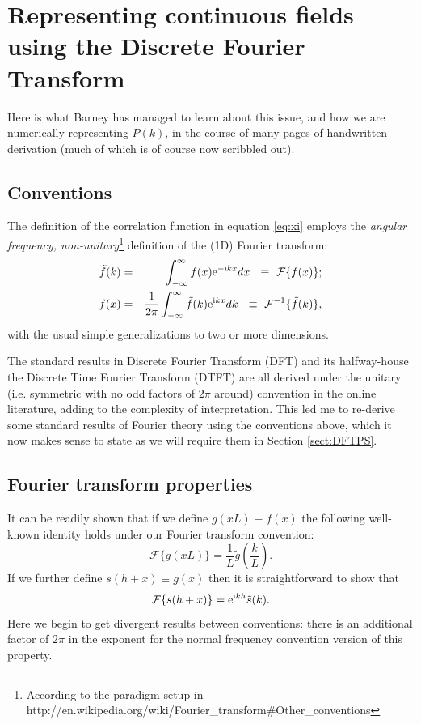 \documentclass[preprint]{aastex}
\newcommand{\mi}{{\rm i}}
\newcommand{\me}{{\rm e}}
\begin{document}
\section{Representing continuous fields using the Discrete Fourier Transform}

Here is what Barney has managed to learn about this issue, and how we
are numerically representing $P(k)$, in the course of many pages of
handwritten derivation (much of which is of course now scribbled out).

\subsection{Conventions}

The definition of the correlation function in equation \eqref{eq:xi}
employs the \emph{angular frequency, non-unitary}\footnote{According
  to the paradigm setup in
  http://en.wikipedia.org/wiki/Fourier\_transform\#Other\_conventions}
definition of the (1D) Fourier transform:
\begin{eqnarray}
\tilde{f}(k) & = & \int_{-\infty}^{\infty} f(x) \me^{-\mi k x}
dx ~ ~ \equiv ~ \mathcal{F} \{ f(x) \} \label{eq:fwdft} ; \\
f(x) & = & \frac{1}{2 \pi} \int_{-\infty}^{\infty} \tilde{f}(k) \me^{\mi k x}
dk ~ ~ \equiv ~ \mathcal{F}^{-1}\{ \tilde{f}(k) \} \label{eq:invft}, 
\end{eqnarray}
with the usual simple generalizations to two or more dimensions.

The standard results in Discrete Fourier Transform (DFT) and its
halfway-house the Discrete Time Fourier Transform (DTFT) are all
derived under the unitary (i.e. symmetric with no odd factors of $2
\pi$ around) convention in the online literature, adding to the complexity of
interpretation.  This led me to re-derive some standard results of
Fourier theory using the conventions above, which it now makes sense
to state as we will require them in Section \ref{sect:DFTPS}.

\subsection{Fourier transform properties}
It can be readily shown that if we define $g(x L) \equiv f(x)$ the following well-known identity holds
under our Fourier transform convention:
\begin{equation}
\mathcal{F}\{g(x L)\} = \frac{1}{L}
\tilde{g}\left(\frac{k}{L}\right). \label{eq:gmult}
\end{equation}
If we further define $s(h + x) \equiv g(x)$ then it is straightforward
to show that
\begin{equation}
\mathcal{F}\{ s(h + x) \} = \me^{\mi k h} \tilde{s}(k).  \label{eq:sadd}
\end{equation}
Here we begin to get divergent results between conventions: there is
an additional factor of $2\pi$ in the exponent for the normal frequency
convention version of this property.
\end{document}
